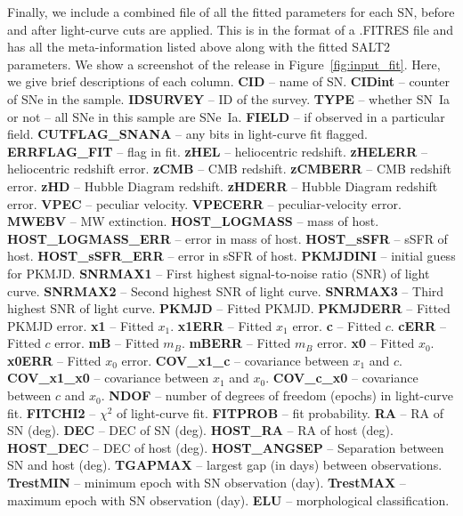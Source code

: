 \documentclass[twocolumn]{aastex63}
\begin{document}
Finally, we include a combined file of all the fitted parameters for each SN, before and after light-curve cuts are applied.  This is in the format of a .FITRES file and has all the meta-information listed above along with the fitted SALT2 parameters.  We show a screenshot of the release in Figure~\ref{fig:input_fit}.  Here, we give brief descriptions of each column.
\textbf{CID} -- name of SN.
\textbf{CIDint} -- counter of SNe in the sample.
\textbf{IDSURVEY} -- ID of the survey.
\textbf{TYPE} -- whether SN~Ia or not -- all SNe in this sample are SNe~Ia.
\textbf{FIELD} -- if observed in a particular field.
\textbf{CUTFLAG\_SNANA} -- any bits in light-curve fit flagged.
\textbf{ERRFLAG\_FIT} -- flag in fit.
\textbf{zHEL} -- heliocentric redshift.
\textbf{zHELERR} -- heliocentric redshift error.
\textbf{zCMB} -- CMB redshift.
\textbf{zCMBERR} -- CMB redshift error.
\textbf{zHD} -- Hubble Diagram redshift.
\textbf{zHDERR} -- Hubble Diagram redshift error.
\textbf{VPEC} -- peculiar velocity.
\textbf{VPECERR} -- peculiar-velocity error.
\textbf{MWEBV} -- MW extinction.
\textbf{HOST\_LOGMASS} -- mass of host.
\textbf{HOST\_LOGMASS\_ERR} -- error in mass of host.
\textbf{HOST\_sSFR} -- sSFR of host.
\textbf{HOST\_sSFR\_ERR} -- error in sSFR of host. 
\textbf{PKMJDINI} -- initial guess for PKMJD.
\textbf{SNRMAX1} -- First highest signal-to-noise ratio (SNR) of light curve.
\textbf{SNRMAX2} -- Second highest SNR of light curve.
\textbf{SNRMAX3} -- Third highest SNR of light curve.
\textbf{PKMJD} -- Fitted PKMJD.
\textbf{PKMJDERR} -- Fitted PKMJD error.
\textbf{x1} -- Fitted $x_1$.
\textbf{x1ERR} -- Fitted $x_1$ error.
\textbf{c} -- Fitted $c$.
\textbf{cERR} -- Fitted $c$ error.
\textbf{mB} -- Fitted $m_B$.
\textbf{mBERR} -- Fitted $m_B$ error.
\textbf{x0} -- Fitted $x_0$.
\textbf{x0ERR} -- Fitted $x_0$ error.
\textbf{COV\_x1\_c} -- covariance between $x_1$ and $c$.
\textbf{COV\_x1\_x0} -- covariance between $x_1$ and $x_0$.
\textbf{COV\_c\_x0} -- covariance between $c$ and $x_0$.
\textbf{NDOF} -- number of degrees of freedom (epochs) in light-curve fit.
\textbf{FITCHI2} -- $\chi ^2$ of light-curve fit.
\textbf{FITPROB} -- fit probability.
\textbf{RA} -- RA of SN (deg).
\textbf{DEC} -- DEC of SN (deg).
\textbf{HOST\_RA} -- RA of host (deg).
\textbf{HOST\_DEC} -- DEC of host (deg). 
\textbf{HOST\_ANGSEP} -- Separation between SN and host (deg).
\textbf{TGAPMAX} -- largest gap (in days) between observations.
\textbf{TrestMIN} -- minimum epoch with SN observation (day).
\textbf{TrestMAX} -- maximum epoch with SN observation (day).
\textbf{ELU} -- morphological classification.
\end{document}
